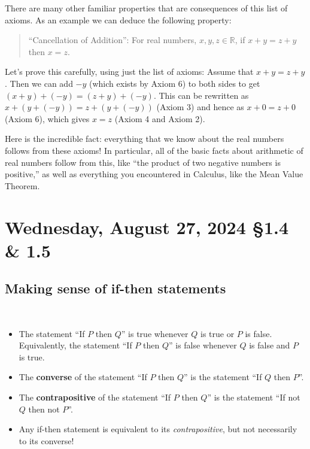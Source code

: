 \documentclass[12pt]{amsart}
\def\We{Wednesday}
\newcommand{\R}{{\mathbb{R}}}
\numberwithin{equation}{section}
\theoremstyle{plain} %
\newcommand{\Aug}[3]{\section{#2, August #1, 2024 \quad \S#3}}
\theoremstyle{definition}
\theoremstyle{remark}
\begin{document}
There are many other familiar properties that are consequences of this list of axioms. As an example we can deduce the following property:
\begin{quote}
  ``Cancellation of Addition'': For real numbers, ${x,y,z\in \R}$,  if $x + y = z + y$ then $x = z$.
\end{quote}
Let's prove this carefully, using just the list of axioms: Assume that $x + y = z + y$. Then we can add $-y$ (which exists by Axiom 6) to both sides to get
$(x + y) + (-y) = (z + y) + (-y)$. This can be rewritten as $x + (y + (-y)) = z + (y + (-y))$ (Axiom 3) and hence as $x + 0 = z + 0$ (Axiom 6), which gives $x = z$ (Axiom 4 and Axiom 2).



Here is the incredible fact: everything that we know about the real numbers follows from these axioms! In particular, all of the basic facts about arithmetic of real numbers follow from this, like ``the product of two negative numbers is positive,'' as well as everything you encountered in Calculus, like the Mean Value Theorem.



\newpage

\Aug{27}{\We}{1.4 \& 1.5}

\subsection*{Making sense of if-then statements}

\

\begin{framed}
\begin{itemize}
\item The statement ``If $P$ then $Q$'' is true whenever $Q$ is true or $P$ is false. Equivalently, the statement ``If $P$ then $Q$'' is false whenever $Q$ is false and $P$ is true.
\item The \textbf{converse} of the statement  ``If $P$ then $Q$'' is the statement  ``If $Q$ then $P$''.
\item The \textbf{contrapositive} of the statement  ``If $P$ then $Q$'' is the statement  ``If not $Q$ then not $P$''.
\item Any if-then statement is equivalent to its \emph{contrapositive}, but not necessarily to its converse!
\end{itemize}
\end{framed}
\end{document}
